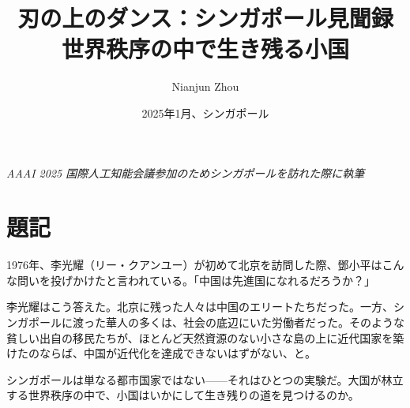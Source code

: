 \documentclass[12pt, a4paper]{book}
\title{
    {\Huge\textbf{刃の上のダンス：シンガポール見聞録}}\\[0.5em]
    {\large 世界秩序の中で生き残る小国}
}
\author{Nianjun Zhou}
\date{2025年1月、シンガポール}
\begin{document}
\frontmatter
\maketitle

\vspace{2em}
\begin{center}
\textit{AAAI 2025 国際人工知能会議参加のためシンガポールを訪れた際に執筆}
\end{center}

\chapter*{題記}

1976年、李光耀（リー・クアンユー）が初めて北京を訪問した際、鄧小平はこんな問いを投げかけたと言われている。「中国は先進国になれるだろうか？」

李光耀はこう答えた。北京に残った人々は中国のエリートたちだった。一方、シンガポールに渡った華人の多くは、社会の底辺にいた労働者だった。そのような貧しい出自の移民たちが、ほとんど天然資源のない小さな島の上に近代国家を築けたのならば、中国が近代化を達成できないはずがない、と。

シンガポールは単なる都市国家ではない——それはひとつの実験だ。大国が林立する世界秩序の中で、小国はいかにして生き残りの道を見つけるのか。

\tableofcontents

\mainmatter






\end{document}
